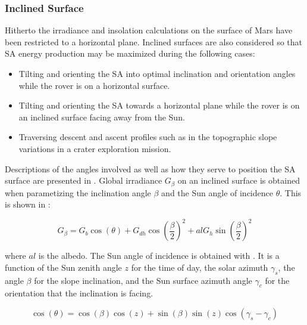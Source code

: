 \subsubsection{Inclined Surface}
\label{sec:MartianEnvironment:SolarRadiation:InclinedSurface}

Hitherto the irradiance and insolation calculations on the surface of Mars have been restricted to a horizontal plane. Inclined surfaces are also considered so that \ac{SA} energy production may be maximized during the following cases:
\begin{itemize}
    \item Tilting and orienting the \ac{SA} into optimal inclination and orientation angles while the rover is on a horizontal surface.
    \item Tilting and orienting the \ac{SA} towards a horizontal plane while the rover is on an inclined surface facing away from the Sun.
    \item Traversing descent and ascent profiles such as in the topographic slope variations in a crater exploration mission.
\end{itemize}

\clearpage
Descriptions of the angles involved as well as how they serve to position the \ac{SA} surface are presented in . Global irradiance $G_{\beta}$ on an inclined surface is obtained when parametizing the inclination angle $\beta$ and the Sun angle of incidence $\theta$. This is shown in :

\begin{equation}
  \label{eq:G_beta}
  G_{\beta} = G_{b}\cos{(\theta)} + G_{dh}\cos{\left(\frac{\beta}{2}\right)}^2 + al G_{h} \sin{\left(\frac{\beta}{2}\right)}^2
\end{equation}

where $al$ is the albedo. The Sun angle of incidence is obtained with . It is a function of the Sun zenith angle $z$ for the time of day, the solar azimuth $\gamma_{s}$, the angle $\beta$ for the slope inclination, and the Sun surface azimuth angle $\gamma_{c}$ for the orientation that the inclination is facing.

\begin{equation}
  \label{eq:costheta}
  \cos{(\theta)} = \cos{(\beta)}\cos{(z)} + \sin{(\beta)}\sin{(z)}\cos{(\gamma_{s} - \gamma_{c})}
\end{equation}

